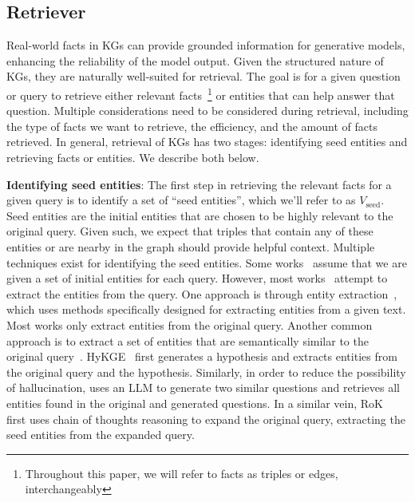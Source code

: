 \subsection{Retriever}

Real-world facts in KGs can provide grounded information for generative models, enhancing the reliability of the model output. Given the structured nature of KGs, they are naturally well-suited for retrieval. The goal is for a given question or query to retrieve either relevant facts~\footnote{Throughout this paper, we will refer to facts as triples or edges, interchangeably} or entities that can help answer that question. Multiple considerations need to be considered during retrieval, including the type of facts we want to retrieve, the efficiency, and the amount of facts retrieved. In general, retrieval of KGs has two stages: identifying seed entities and retrieving facts or entities. We describe both below.


{\bf Identifying seed entities}: The first step in retrieving the relevant facts for a given query is to identify a set of ``seed entities'', which we'll refer to as $V_{\text{seed}}$. Seed entities are the initial entities that are chosen to be highly relevant to the original query. Given such, we expect that triples that contain any of these entities or are nearby in the graph should provide helpful context. Multiple techniques exist for identifying the seed entities. Some works~\cite{jiang2023structgpt, kim2023kg, gnn_llm, pullnet, zhang2022subgraph} assume that we are given a set of initial entities for each query. However, most works~\cite{feng2020scalable, sunthink, wen2023mindmap, zhanggreaselm, niu2024mitigating, yasunaga2022deep} attempt to extract the entities from the query. One approach is through entity extraction~\cite{al2020named}, which uses methods specifically designed for extracting entities from a given text. Most works only extract entities from the original query. Another common approach is to extract a set of entities that are semantically similar to the original query~\cite{wen2023mindmap, sanmartin2024kg}. HyKGE~\cite{jiang2024hykge} first generates a hypothesis and extracts entities from the original query and the hypothesis. Similarly, in order to reduce the possibility of hallucination, \citet{knowledgenavigator} uses an LLM to generate two similar questions and retrieves all entities found in the original and generated questions. In a similar vein, RoK~\cite{wang2024reasoning} first uses chain of thoughts reasoning to expand the original query, extracting the seed entities from the expanded query. 


